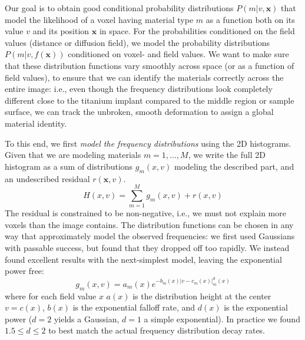 \newcommand{\xx}{\mathbf{x}}
\newcommand{\fval}{x}
\newcommand{\lab}{\mathrm{L}}
Our goal is to obtain good conditional probability distributions $P(m|v,\xx)$
that model the likelihood of a voxel having material type $m$ as a function
both on its value $v$ and its position $\xx$ in space. For the probabilities
conditioned on the field values (distance or diffusion field), we model
the probability distributions $P(m|v,f(\xx))$ conditioned on
voxel- and field values. We want to make sure that these distribution
functions vary smoothly across space (or as a function of field values),
to ensure that we can identify the materials correctly across the entire
image: i.e., even though the frequency distributions look completely different
close to the titanium implant compared to the middle region or sample surface,
we can track the unbroken, smooth deformation to assign a global material
identity.

To this end, we first {\em model the frequency distributions} using the
2D histograms. Given that we are modeling materials $m=1,\ldots,M$,
we write the full 2D histogram as a sum of distributions
$g_m(\fval,v)$ modeling the described part, and an undescribed
residual $r(\xx,v)$.
\begin{equation}
  \label{eq:hist}
  H(\fval,v) = \sum_{m=1}^M g_m(\fval,v) + r(\fval,v)
\end{equation}
The residual is constrained to be non-negative, i.e., we must not explain
more voxels than the image contains.
The distribution functions can be chosen in any way that approximately
model the observed frequencies: we first used Gaussians with passable success,
but found that they dropped off too rapidly. We instead found excellent results
with the next-simplest model, leaving the exponential power free:
\begin{equation}
  \label{eq:dist-form}
  g_m(\fval,v) = a_m(\fval) e^{-b_m(\fval) |v-c_m(\fval)|^d_m(\fval)}
\end{equation}
where for each field value $\fval$
$a(\fval)$ is the distribution height at the center $v=c(\fval)$,
$b(\fval)$ is the exponential falloff rate, and $d(\fval)$ is
the exponential power ($d=2$ yields a Gaussian, $d=1$ a simple exponential).
In practice we found $1.5\le d \le 2$ to best match the actual frequency
distribution decay rates.

